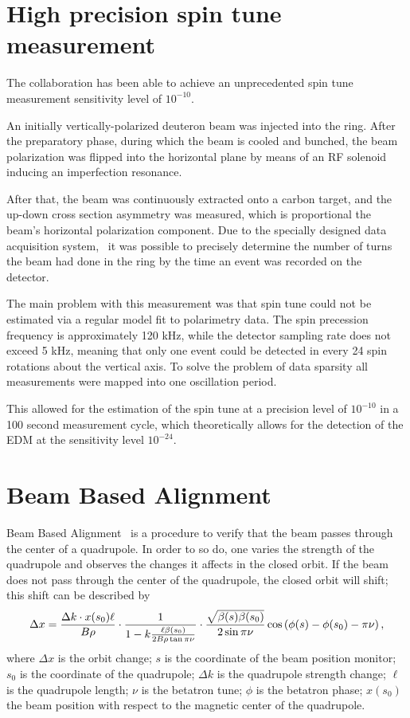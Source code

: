 

\section{High precision spin tune measurement}
The collaboration has been able to achieve an unprecedented spin tune measurement sensitivity level 
of $10^{-10}$. 

An initially vertically-polarized deuteron beam was injected into the ring. After the preparatory phase, during which the beam is cooled and bunched, the beam polarization was flipped into the horizontal plane by means of an RF solenoid inducing an imperfection resonance.~\cite[p.~7]{COSY:SpinTuneMapping}

After that, the beam was continuously extracted onto a carbon target, and the up-down 
cross section asymmetry was measured, which is proportional the beam's horizontal polarization component. Due to the specially designed data acquisition system,~\cite{COSY:DAQ} it was possible to precisely determine the number of turns the beam had done in the ring by the time an event was recorded on the detector.

The main problem with this measurement was that spin tune could not be estimated via 
a regular model fit to polarimetry data.
The spin precession frequency is approximately 120 kHz, while the detector sampling rate does not 
exceed 5 kHz, meaning that only one event could be detected in every 24 spin rotations about the vertical axis.
To solve the problem of data sparsity all measurements were mapped into one oscillation period.~\cite{Eversmann:SpinTuneMeasurement}

This allowed for the estimation of the spin tune at a precision level of $10^{-10}$ in a 100 second measurement cycle, which theoretically allows for the detection of the EDM at the sensitivity level $10^{-24}$\ecm.

\section{Beam Based Alignment}
\newcommand{\Nbpm}{N_{\mathrm{BPM}}}
Beam Based Alignment~\cite{Wagner:BBA2018} is a procedure to verify 
that the beam passes through the center of a quadrupole.
In order to so do, one varies the strength of the quadrupole and observes the changes it affects in the 
closed orbit. If the beam does not pass through the center of the quadrupole, the closed orbit will shift;
this shift can be described by
\[
\Delta x = \frac{\Delta k\cdot x(s_0)\ell}{B\rho}\cdot \frac{1}{1 - k\frac{\ell\beta(s_0)}{2B\rho\tan\pi\nu}}\cdot \frac{\sqrt{\beta(s)\beta(s_0)}}{2\sin\pi\nu}\cos\bkt{\phi(s) - \phi(s_0) - \pi\nu},
\]
where $\Delta x$ is the orbit change; $s$ is the coordinate of the beam position monitor; $s_0$ is the coordinate of the quadrupole; $\Delta k$ is the quadrupole strength change; $\ell$ is the quadrupole length; $\nu$ is the betatron tune; $\phi$ is the betatron phase; $x(s_0)$ the beam position with respect to the magnetic center of the quadrupole.

